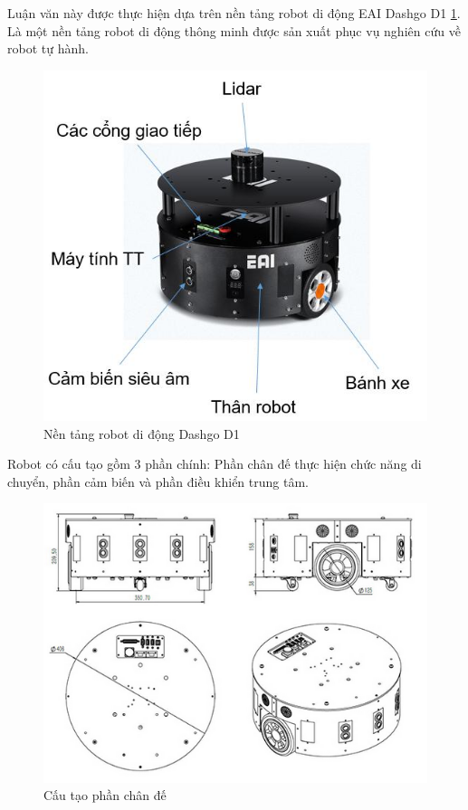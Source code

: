 Luận văn này được thực hiện dựa trên nền tảng robot di động EAI Dashgo D1 \figurename{\ref{fig:dashgoD1}}. Là một nền tảng robot di động thông minh được sản xuất phục vụ nghiên cứu về robot tự hành.


\begin{figure}[htp]
	\centering
	\includegraphics[width=0.7\linewidth]{figures/dashgoD1.JPG}
	\caption{Nền tảng robot di động Dashgo D1}
	\label{fig:dashgoD1}
\end{figure}

Robot có cấu tạo gồm 3 phần chính: Phần chân đế thực hiện chức năng di chuyển, phần cảm biến và phần điều khiển trung tâm.

\begin{figure}[htbp]
	\centering
	\includegraphics[width=0.7\linewidth]{figures/dashgo_base.png}
	\caption{Cấu tạo phần chân đế}
	\label{fig:dashgoBase}
\end{figure}

